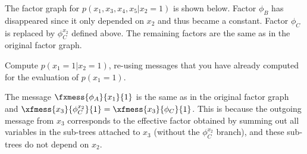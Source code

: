 \begin{exenumerate}
\begin{solution}
    The factor graph for $p(x_1, x_3, x_4, x_5 | x_2 =1)$ is shown below. Factor $\phi_B$ has disappeared since it only depended on $x_2$ and thus became a constant. Factor $\phi_C$ is replaced by $\phi_C^{x_2}$ defined above. The remaining factors are the same as in the original factor graph.
        
    \begin{center}
    \end{center}
    
  \end{solution}

\item Compute $p(x_1 =1 | x_2 = 1)$, re-using messages that you have already computed for the evaluation of $p(x_1 =1)$.

  \begin{solution}
    The message $\fxmess{\phi_A}{x_1}{1}$ is the same as in the
    original factor graph and $\xfmess{x_3}{\phi_C^{x_2}}{1} =
    \xfmess{x_3}{\phi_C}{1}$. This is because the outgoing message
    from $x_3$ corresponds to the effective factor obtained by summing
    out all variables in the sub-trees attached to $x_3$ (without the
    $\phi_C^{x_2}$ branch), and these sub-trees do not depend on $x_2$.


\end{solution}
\end{exenumerate}
